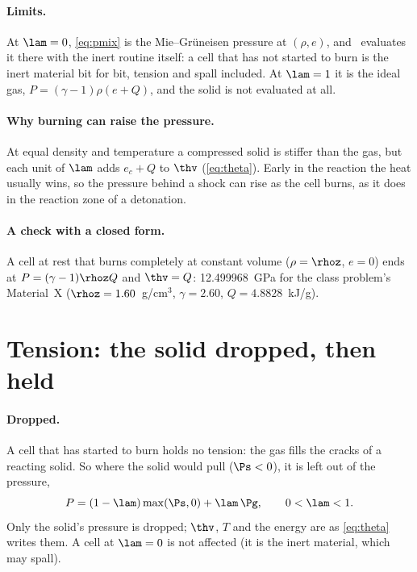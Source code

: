 \paragraph{Limits.} At $\lam = 0$, \cref{eq:pmix} is the Mie--Gr\"uneisen
pressure at $(\rho, e)$, and \bw\ evaluates it there with the inert
routine itself: a cell that has not started to burn is the inert material
bit for bit, tension and spall included. At $\lam = 1$ it is the ideal gas,
$P = (\gamma - 1)\rho(e + Q)$, and the solid is not evaluated at all.

\paragraph{Why burning can raise the pressure.} At equal density and
temperature a compressed solid is stiffer than the gas, but each unit of
$\lam$ adds $e_c + Q$ to $\thv$ (\cref{eq:theta}). Early in the reaction
the heat usually wins, so the pressure behind a shock can rise as the cell
burns, as it does in the reaction zone of a detonation.

\paragraph{A check with a closed form.} A cell at rest that burns
completely at constant volume ($\rho = \rhoz$, $e = 0$) ends at
$P = (\gamma - 1)\rhoz Q$ and $\thv = Q$: 12.499968~GPa for the class
problem's Material~X ($\rhoz = 1.60$~g/cm$^3$, $\gamma = 2.60$,
$Q = 4.8828$~kJ/g).

\section{Tension: the solid dropped, then held}
\label{sec:tension}

\paragraph{Dropped.} A cell that has started to burn holds no tension: the
gas fills the cracks of a reacting solid. So where the solid would pull
($\Ps < 0$), it is left out of the pressure,
\begin{equation}
  P = (1 - \lam)\max(\Ps, 0) + \lam\,\Pg, \qquad 0 < \lam < 1.
  \label{eq:dropped}
\end{equation}
Only the solid's pressure is dropped; $\thv$, $T$ and the energy are as
\cref{eq:theta} writes them. A cell at $\lam = 0$ is not affected (it is the
inert material, which may spall).

